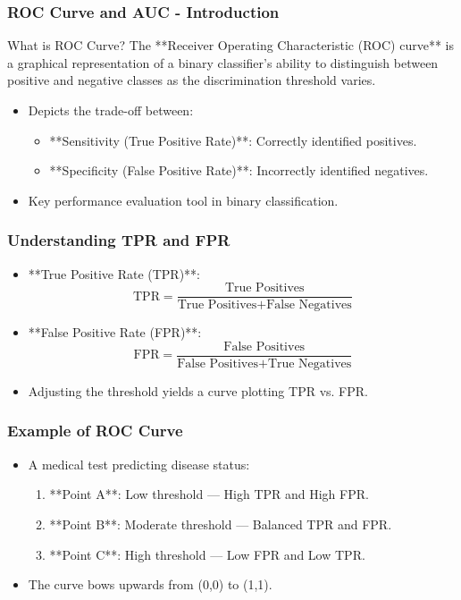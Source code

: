 \documentclass[aspectratio=169]{beamer}
\begin{document}
\begin{frame}[fragile]
    \frametitle{ROC Curve and AUC - Introduction}
    \begin{block}{What is ROC Curve?}
        The **Receiver Operating Characteristic (ROC) curve** is a graphical representation of a binary classifier's ability to distinguish between positive and negative classes as the discrimination threshold varies. 
    \end{block}
    \begin{itemize}
        \item Depicts the trade-off between:
            \begin{itemize}
                \item **Sensitivity (True Positive Rate)**: Correctly identified positives.
                \item **Specificity (False Positive Rate)**: Incorrectly identified negatives.
            \end{itemize}
        \item Key performance evaluation tool in binary classification.
    \end{itemize}
\end{frame}

\begin{frame}[fragile]
    \frametitle{Understanding TPR and FPR}
    \begin{itemize}
        \item **True Positive Rate (TPR)**:
        \begin{equation}
            \text{TPR} = \frac{\text{True Positives}}{\text{True Positives} + \text{False Negatives}}
        \end{equation}
        \item **False Positive Rate (FPR)**:
        \begin{equation}
            \text{FPR} = \frac{\text{False Positives}}{\text{False Positives} + \text{True Negatives}}
        \end{equation}
        \item Adjusting the threshold yields a curve plotting TPR vs. FPR.
    \end{itemize}
\end{frame}

\begin{frame}[fragile]
    \frametitle{Example of ROC Curve}
    \begin{itemize}
        \item A medical test predicting disease status:
        \begin{enumerate}
            \item **Point A**: Low threshold — High TPR and High FPR.
            \item **Point B**: Moderate threshold — Balanced TPR and FPR.
            \item **Point C**: High threshold — Low FPR and Low TPR.
        \end{enumerate}
        \item The curve bows upwards from (0,0) to (1,1).
    \end{itemize}
\end{frame}
\end{document}
